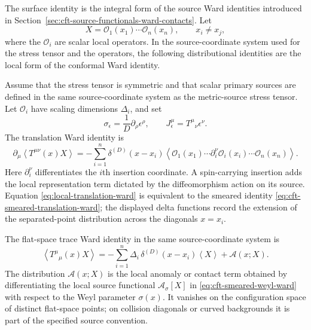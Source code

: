 The surface identity is the integral form of the source Ward identities
introduced in Section~\ref{sec:cft-source-functionals-ward-contacts}.  Let
\[
  X=\mathcal O_1(x_1)\cdots\mathcal O_n(x_n),
  \qquad x_i\ne x_j ,
\]
where the \(\mathcal O_i\) are scalar local operators.  In the source-coordinate system
used for the stress tensor and the operators, the following distributional
identities are the local form of the conformal Ward identity.

\begin{proposition}
\label{prop:local-conformal-current-ward}
Assume that the stress tensor is symmetric and that scalar primary sources are
defined in the same source-coordinate system as the metric-source stress tensor.  Let
\(\mathcal O_i\) have scaling dimensions \(\Delta_i\), and set
\[
  \sigma_\epsilon=\frac1D\partial_\rho\epsilon^\rho,
  \qquad
  J^\mu_\epsilon=T^\mu{}_\nu\epsilon^\nu .
\]
The translation Ward identity is
\begin{equation}
  \partial_\mu
  \left\langle
    T^{\mu\nu}(x)X
  \right\rangle
  =
  -\sum_{i=1}^n
  \delta^{(D)}(x-x_i)
  \left\langle
    \mathcal O_1(x_1)\cdots
    \partial_i^\nu\mathcal O_i(x_i)\cdots
    \mathcal O_n(x_n)
  \right\rangle .
  \label{eq:local-translation-ward}
\end{equation}
Here \(\partial_i^\nu\) differentiates the \(i\)th insertion coordinate.  A
spin-carrying insertion adds the local representation term dictated by the
diffeomorphism action on its source.  Equation
\eqref{eq:local-translation-ward} is equivalent to the smeared identity
\eqref{eq:cft-smeared-translation-ward}; the displayed delta functions record
the extension of the separated-point distribution across the diagonals
\(x=x_i\).

The flat-space trace Ward identity in the same source-coordinate system is
\begin{equation}
  \left\langle
    T^\mu{}_\mu(x)X
  \right\rangle
  =
  -\sum_{i=1}^n
  \Delta_i\,\delta^{(D)}(x-x_i)
  \left\langle X\right\rangle
  +
  \mathcal A(x;X).
  \label{eq:local-trace-ward}
\end{equation}
The distribution \(\mathcal A(x;X)\) is the local anomaly or contact term
obtained by differentiating the local source functional
\(\mathcal A_\sigma[X]\) in \eqref{eq:cft-smeared-weyl-ward} with respect to
the Weyl parameter \(\sigma(x)\).  It vanishes on the configuration space of
distinct flat-space points; on collision diagonals or curved backgrounds it is
part of the specified source convention.


\end{proposition}
